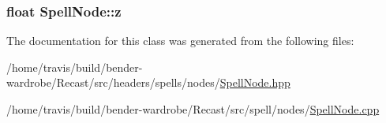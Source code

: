 \hypertarget{class_spell_node_aff090331ff1bd816a22e974a50c1a180}{
\subsubsection[{z}]{\setlength{\rightskip}{0pt plus 5cm}float Spell\-Node\-::z\hspace{0.3cm}{\ttfamily [protected]}}}\label{class_spell_node_aff090331ff1bd816a22e974a50c1a180}


The documentation for this class was generated from the following files\-:\begin{DoxyCompactItemize}
\item 
/home/travis/build/bender-\/wardrobe/\-Recast/src/headers/spells/nodes/\hyperlink{_spell_node_8hpp}{Spell\-Node.\-hpp}\item 
/home/travis/build/bender-\/wardrobe/\-Recast/src/spell/nodes/\hyperlink{_spell_node_8cpp}{Spell\-Node.\-cpp}\end{DoxyCompactItemize}
